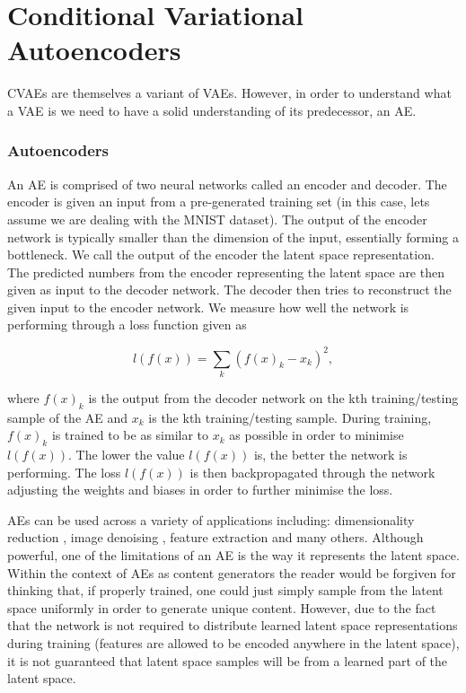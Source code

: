 \section{Conditional Variational Autoencoders}

\ac{CVAE}s are themselves a variant of 
\ac{VAE}s. However, in order to understand what a \ac{VAE} 
is we need to have a solid understanding of its predecessor, 
an \ac{AE}.


%
%
\subsubsection{Autoencoders}

An \ac{AE} is 
comprised of two neural networks called an 
encoder and decoder. The encoder is given an input 
from a pre-generated training set (in this case, lets assume 
we are dealing with the MNIST dataset). The output of the 
encoder network is typically smaller than the dimension of 
the input, essentially forming a bottleneck. 
We call the output of the encoder the latent space representation. 
The predicted numbers from the encoder representing the latent 
space are then given as input to the decoder network. The 
decoder then tries to reconstruct the given input to the 
encoder network. We measure how well the network is performing 
through a loss function given as 

\begin{equation}
    l(f(x)) = \sum_k{(f(x)_k - x_k)^2},
\end{equation}

where $f(x)_k$ is the output from the decoder network on the 
kth training/testing sample of the \ac{AE} and $x_k$ is the 
kth training/testing sample. During training, $f(x)_k$ is trained 
to be as similar to $x_k$ as possible in order to minimise 
$l(f(x))$. The lower the value $l(f(x))$ is, the better the network 
is performing. The loss $l(f(x))$ is then backpropagated through 
the network adjusting the weights and biases in order to  
further minimise the loss.

\ac{AE}s can be used across a variety of applications including: 
dimensionality reduction \cite{6910027}, image denoising \cite{NISHIO2017e00393},
feature extraction \cite{7965877} and many others. Although powerful, 
one of the limitations of an \ac{AE} is the way it represents the 
latent space. Within the context of \ac{AE}s as content generators 
the reader would be forgiven for thinking that, if properly trained, 
one could just simply sample from the latent space uniformly 
in order to generate unique content. However, due to the fact 
that the network is not required to distribute learned latent 
space representations during training (features are allowed 
to be encoded anywhere in the latent space), it is not 
guaranteed that latent space samples will be from a 
learned part of the latent space.


